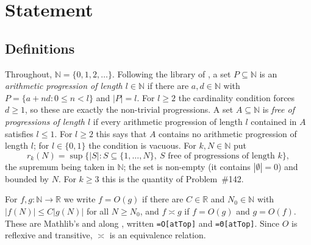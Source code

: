 \documentclass[11pt]{amsart}
\theoremstyle{plain}
\theoremstyle{definition}
\newcommand{\N}{\mathbb{N}}
\newcommand{\R}{\mathbb{R}}
\begin{document}
\section{Statement}\label{sec:statement}

\subsection{Definitions}
Throughout, $\N=\{0,1,2,\dots\}$.
Following the library of \cite{FC}, a set $P\subseteq\N$ is an \emph{arithmetic progression of length $l\in\N$} if there are $a,d\in\N$ with $P=\{a+nd : 0\le n<l\}$ and $|P|=l$.
For $l\ge2$ the cardinality condition forces $d\ge1$, so these are exactly the non-trivial progressions.
A set $A\subseteq\N$ is \emph{free of progressions of length $l$} if every arithmetic progression of length $l$ contained in $A$ satisfies $l\le1$.
For $l\ge2$ this says that $A$ contains no arithmetic progression of length $l$; for $l\in\{0,1\}$ the condition is vacuous.
For $k,N\in\N$ put
\[
  r_k(N)=\sup\bigl\{|S| : S\subseteq\{1,\dots,N\},\ S\text{ free of progressions of length }k\bigr\},
\]
the supremum being taken in $\N$; the set is non-empty (it contains $|\emptyset|=0$) and bounded by $N$.
For $k\ge3$ this is the quantity of Problem~\#142.

For $f,g\colon\N\to\R$ we write $f=O(g)$ if there are $C\in\R$ and $N_0\in\N$ with $|f(N)|\le C|g(N)|$ for all $N\ge N_0$, and $f\asymp g$ if $f=O(g)$ and $g=O(f)$.
These are Mathlib's  and  along , written \texttt{=O[atTop]} and \texttt{=Θ[atTop]}.
Since $O$ is reflexive and transitive, $\asymp$ is an equivalence relation.
\end{document}
